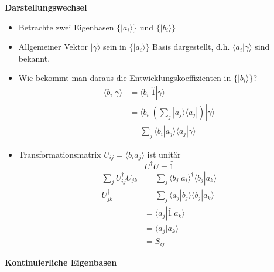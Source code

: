 \documentclass[10pt,article,colorback,accentcolor=tud9d]{scrartcl}
\begin{document}
\textbf{Darstellungswechsel}
\begin{itemize}
	\item Betrachte zwei Eigenbasen $\{|a_i\rangle\}$ und $\{|b_i\rangle\}$
  \item Allgemeiner Vektor $|\gamma\rangle$ sein in $\{|a_i\rangle\}$ Basis dargestellt, d.h. $\langle a_i|\gamma\rangle$ sind bekannt.
  \item Wie bekommt man daraus die Entwicklungskoeffizienten in $\{|b_i\rangle\}$?
  \begin{equation}
  \begin{aligned}
    \langle b_i |\gamma\rangle&=\langle b_i|\hat{1}|\gamma\rangle\\
    &=\langle b_i |\left(\sum_j|a_j\rangle\langle a_j|\right)|\gamma\rangle\\
    &=\sum_j\langle b_i|a_j\rangle\langle a_j|\gamma\rangle
  \end{aligned}
  \end{equation}
  \item Transformationsmatrix $U_{ij} =\langle b_ia_j\rangle$ ist unitär
    \begin{equation}
      U^{\dagger}U=\hat{1}
     \end{equation}
     \begin{equation}
      \begin{aligned}
      \sum_jU^{\dagger}_{ij}U_{jk}&=\sum_j\langle b_j|a_i\rangle^{\dagger}\langle b_j|a_k\rangle\\
      U_{jk}^{\dagger}&=\sum_j\langle a_j|b_j\rangle\langle b_j|a_k\rangle\\
      &=\langle a_j|\hat{1}|a_k\rangle\\
      &=\langle a_j|a_k\rangle\\
      &=S_{ij}
      \end{aligned}
    \end{equation}
\end{itemize}
\textbf{Kontinuierliche Eigenbasen}
\end{document}
